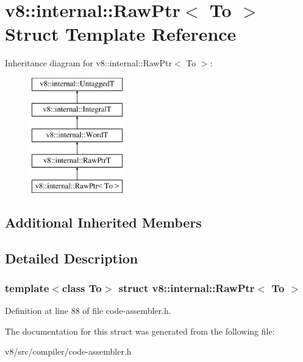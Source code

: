 \hypertarget{structv8_1_1internal_1_1RawPtr}{}\section{v8\+:\+:internal\+:\+:Raw\+Ptr$<$ To $>$ Struct Template Reference}
\label{structv8_1_1internal_1_1RawPtr}
Inheritance diagram for v8\+:\+:internal\+:\+:Raw\+Ptr$<$ To $>$\+:\begin{figure}[H]
\begin{center}
\leavevmode
\includegraphics[height=5.000000cm]{structv8_1_1internal_1_1RawPtr}
\end{center}
\end{figure}
\subsection*{Additional Inherited Members}


\subsection{Detailed Description}
\subsubsection*{template$<$class To$>$\newline
struct v8\+::internal\+::\+Raw\+Ptr$<$ To $>$}



Definition at line 88 of file code-\/assembler.\+h.



The documentation for this struct was generated from the following file\+:\begin{DoxyCompactItemize}
\item 
v8/src/compiler/code-\/assembler.\+h\end{DoxyCompactItemize}

